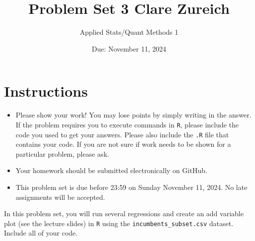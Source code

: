 \documentclass[12pt,letterpaper]{article}
\title{Problem Set 3 Clare Zureich}
\date{Due: November 11, 2024}
\author{Applied Stats/Quant Methods 1}
\begin{document}
	\maketitle
	\section*{Instructions}
	\begin{itemize}
		\item Please show your work! You may lose points by simply writing in the answer. If the problem requires you to execute commands in \texttt{R}, please include the code you used to get your answers. Please also include the \texttt{.R} file that contains your code. If you are not sure if work needs to be shown for a particular problem, please ask.
	\item Your homework should be submitted electronically on GitHub.
	\item This problem set is due before 23:59 on Sunday November 11, 2024. No late assignments will be accepted.

	\end{itemize}

		\vspace{.25cm}
	
\noindent In this problem set, you will run several regressions and create an add variable plot (see the lecture slides) in \texttt{R} using the \texttt{incumbents\_subset.csv} dataset. Include all of your code.

	\vspace{.5cm}
\end{document}
